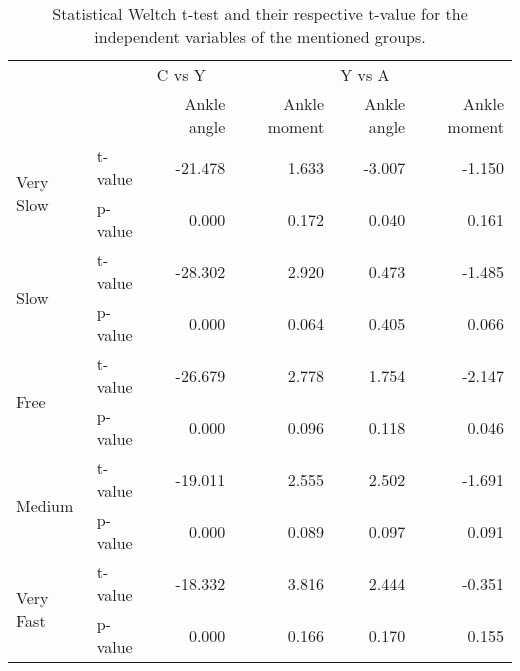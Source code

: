 \begin{table}
\centering
\caption{Statistical Weltch t-test and their respective t-value for the independent variables of the mentioned groups.}
\label{tab:ferra_stats}
\begin{tabular}{llrrrr}
\toprule
          &         & \multicolumn{2}{l}{C vs Y} & \multicolumn{2}{l}{Y vs A} \\
          &         & Ankle angle & Ankle moment & Ankle angle & Ankle moment \\
\midrule
\multirow{2}{*}{Very Slow} & t-value &     -21.478 &        1.633 &      -3.007 &       -1.150 \\
          & p-value &       0.000 &        0.172 &       0.040 &        0.161 \\
\cline{1-6}
\multirow{2}{*}{Slow} & t-value &     -28.302 &        2.920 &       0.473 &       -1.485 \\
          & p-value &       0.000 &        0.064 &       0.405 &        0.066 \\
\cline{1-6}
\multirow{2}{*}{Free} & t-value &     -26.679 &        2.778 &       1.754 &       -2.147 \\
          & p-value &       0.000 &        0.096 &       0.118 &        0.046 \\
\cline{1-6}
\multirow{2}{*}{Medium} & t-value &     -19.011 &        2.555 &       2.502 &       -1.691 \\
          & p-value &       0.000 &        0.089 &       0.097 &        0.091 \\
\cline{1-6}
\multirow{2}{*}{Very Fast} & t-value &     -18.332 &        3.816 &       2.444 &       -0.351 \\
          & p-value &       0.000 &        0.166 &       0.170 &        0.155 \\
\bottomrule
\end{tabular}
\end{table}
